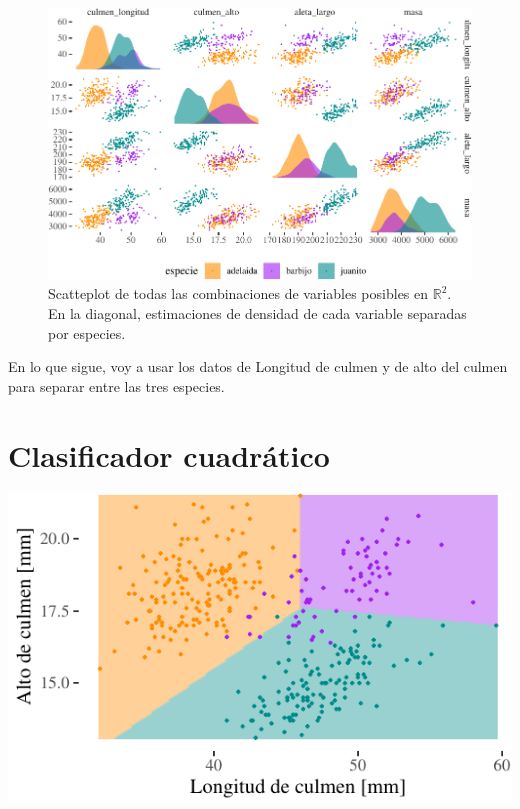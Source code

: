 \documentclass[]{tufte-handout}
\begin{document}
\begin{figure}

{\centering \includegraphics{TP-Labo-2_files/figure-latex/pairs-1} 

}

\caption[Scatteplot de todas las combinaciones de variables posibles en $\mathbb{R}^2$]{Scatteplot de todas las combinaciones de variables posibles en $\mathbb{R}^2$. En la diagonal, estimaciones de densidad de cada variable separadas por especies.}\label{fig:pairs}
\end{figure}

En lo que sigue, voy a usar los datos de Longitud de culmen y de alto del culmen para separar entre las tres especies.

\hypertarget{clasificador-cuadruxe1tico}{%
\section{Clasificador cuadrático}\label{clasificador-cuadruxe1tico}}

\begin{center}\includegraphics{TP-Labo-2_files/figure-latex/unnamed-chunk-6-1} \end{center}
\end{document}
